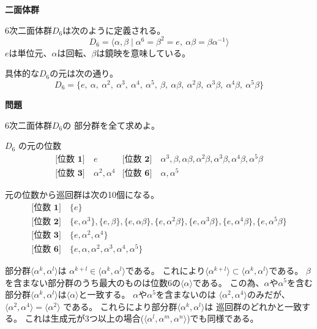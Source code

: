 \documentclass[12pt,b5paper]{ltjsarticle}
\begin{document}
\hrulefill
\textbf{二面体群}
\hrulefill

6次二面体群$D_6$は次のように定義される。
\begin{equation}
 D_{6} = \langle \alpha , \beta \mid \alpha^{6}=\beta^{2}=e ,\ \alpha\beta=\beta\alpha^{-1} \rangle
\end{equation}
$e$は単位元、$\alpha$は回転、$\beta$は鏡映を意味している。

具体的な$D_{6}$の元は次の通り。
\begin{equation}
 D_{6}=
  \{ e,\ \alpha,\ \alpha^2,\ \alpha^3,\ \alpha^4,\ \alpha^5,\
  \beta,\ \alpha\beta,\ \alpha^2\beta,\
  \alpha^3\beta,\ \alpha^4\beta,\ \alpha^5\beta \}
\end{equation}


\hrulefill
\textbf{問題}
\hrulefill

6次二面体群$D_6$の
部分群を全て求めよ。

\dotfill



$D_{6}$
の元の位数
\begin{align}
 \textbf{[位数 1]} &\
 e
 &
 \textbf{[位数 2]} &\
 \alpha^3,\beta,\alpha\beta,\alpha^2\beta,
 \alpha^3\beta,\alpha^4\beta,\alpha^5\beta
 \\
 \textbf{[位数 3]} &\
 \alpha^2,\alpha^4
 &
 \textbf{[位数 6]} &\
 \alpha,\alpha^5
\end{align}

元の位数から巡回群は次の10個になる。
\begin{align}
 \textbf{[位数 1]} &\
 \{ e \}
 \\
 \textbf{[位数 2]} &\
 \{ e, \alpha^3 \}, \{ e, \beta \}, \{ e, \alpha\beta \},
 \{ e, \alpha^2\beta \}, \{ e, \alpha^3\beta \},
 \{ e, \alpha^4\beta\}, \{ e, \alpha^5\beta \}
 \\
 \textbf{[位数 3]} &\
  \{ e, \alpha^2, \alpha^4 \}
 \\
 \textbf{[位数 6]} &\
 \{ e, \alpha, \alpha^2, \alpha^3, \alpha^4, \alpha^5 \}
\end{align}


部分群$\langle \alpha^k, \alpha^l \rangle$は
$\alpha^{k+l} \in \langle \alpha^k,\alpha^l \rangle$である。
これにより$\langle \alpha^{k+l} \rangle \subset \langle \alpha^k,\alpha^l \rangle$である。
$\beta$を含まない部分群のうち最大のものは位数6の$\langle \alpha \rangle$である。
この為、$\alpha$や$\alpha^5$を含む部分群$\langle \alpha^k, \alpha^l \rangle$は$\langle \alpha \rangle$と一致する。
$\alpha$や$\alpha^5$を含まないのは
$\langle \alpha^2,\alpha^4 \rangle$のみだが、
$\langle \alpha^2,\alpha^4 \rangle = \langle \alpha^2 \rangle$
である。
これらにより部分群$\langle \alpha^k, \alpha^l \rangle$は
巡回群のどれかと一致する。
これは生成元が3つ以上の場合($\langle \alpha^l,\alpha^m,\alpha^n \rangle$)でも同様である。
\end{document}
